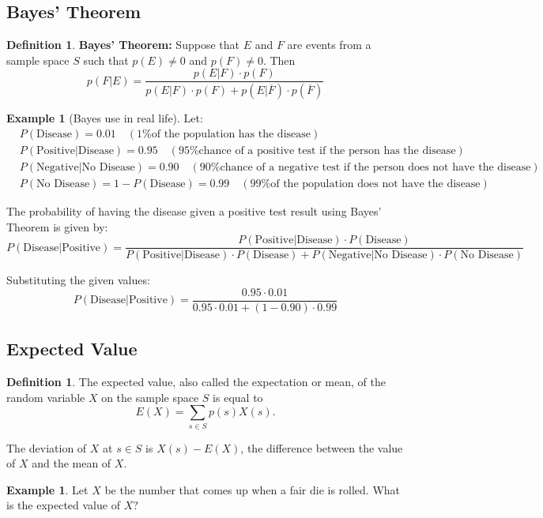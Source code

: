 \documentclass[letterpaper,10pt]{article}
\theoremstyle{plain}
\theoremstyle{definition}
\newtheorem{defn}[thm]{Definition}
\newtheorem{exmp}[thm]{Example}
\theoremstyle{remark}
\begin{document}
\subsection{Bayes' Theorem}
\begin{defn}
\textbf{Bayes' Theorem:} Suppose that \(E\) and \(F\) are events from a sample space \(S\) such that \(p(E) \neq 0\) and \(p(F) \neq 0\). Then
\[
p(F | E) = \frac{p(E | F) \cdot p(F)}{p(E | F) \cdot p(F) + p(E | \overline{F}) \cdot p(\overline{F})}
\]
\end{defn}
\begin{exmp}[Bayes use in real life]

Let:
\begin{align*}
& P(\text{Disease}) = 0.01 \quad (\text{1\% of the population has the disease}) \\
& P(\text{Positive} | \text{Disease}) = 0.95 \quad (\text{95\% chance of a positive test if the person has the disease}) \\
& P(\text{Negative} | \text{No Disease}) = 0.90 \quad (\text{90\% chance of a negative test if the person does not have the disease}) \\
& P(\text{No Disease}) = 1 - P(\text{Disease}) = 0.99 \quad (\text{99\% of the population does not have the disease})
\end{align*}

The probability of having the disease given a positive test result using Bayes' Theorem is given by:
\[
P(\text{Disease} | \text{Positive}) = \frac{P(\text{Positive} |\text{Disease}) \cdot P(\text{Disease})}{P(\text{Positive} | \text{Disease}) \cdot P(\text{Disease}) + P(\text{Negative} | \text{No Disease}) \cdot P(\text{No Disease})}
\]

Substituting the given values:
\[
P(\text{Disease} | \text{Positive}) = \frac{0.95 \cdot 0.01}{0.95 \cdot 0.01 + (1 - 0.90) \cdot 0.99}
\]

\end{exmp}
\subsection{Expected Value}
\begin{defn}
The expected value, also called the expectation or mean, of the random variable \(X\) on the sample space \(S\) is equal to
\[ E(X) = \sum_{s \in S} p(s)X(s). \]

The deviation of \(X\) at \(s \in S\) is \(X(s) - E(X)\), the difference between the value of \(X\) and the mean of \(X\).

\end{defn}
\begin{exmp}
Let $X$ be the number that comes up when a fair die is rolled. What
is the expected value of $X$?
\vspace{3cm}
\end{exmp}
\end{document}
